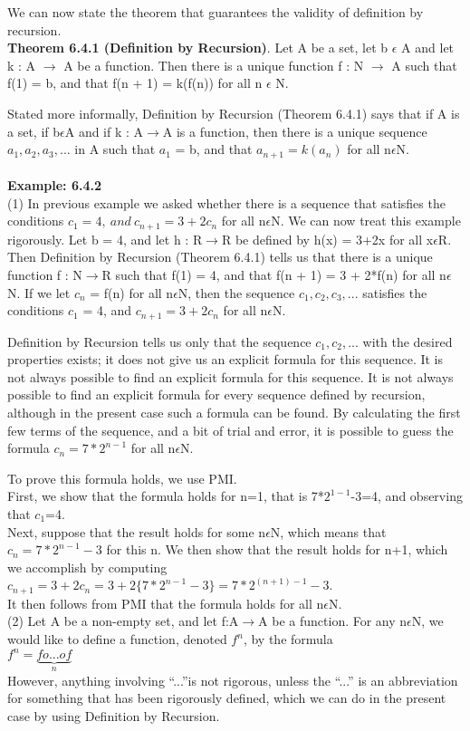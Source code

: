 \documentclass[a4paper,10pt]{report}
\begin{document}
    We can now state the theorem that guarantees the validity of definition by recursion. \\
{\bf Theorem 6.4.1 (Definition by Recursion)}. Let A be a set, let b $\epsilon$ A and let k : A $\rightarrow$ A be a function. Then there is a unique function f : N $\rightarrow$ A such that f(1) = b, and that f(n + 1) = k(f(n)) for all n $\epsilon$ N.

     Stated more informally, Definition by Recursion (Theorem 6.4.1) says that if A is a set, if b$\epsilon$A and if k : 
A$\rightarrow$A is a function,  then there is a unique sequence $a_1, a_2, a_3 , . . .$ in A such that $a_1$ = b, and that $a_{n+1} = k(a_n)$ for all n$\epsilon$N. \\\\
{\bf Example: 6.4.2} 
\\
(1) In previous example we asked whether there is a sequence that satisfies the conditions $c_1 = 4,~ and~ c_{n+1} = 3 + 2c_n$ for all n$\epsilon$N. We can now treat this example rigorously. Let b = 4, and let h : R$\rightarrow$R be defined by h(x) = 3+2x for all x$\epsilon$R. Then Definition by Recursion (Theorem 6.4.1) tells us that there is a unique function f : N$\rightarrow$R such that f(1) = 4, and that f(n + 1) = 3 + 2*f(n) for all n$\epsilon$N. If we let $c_n$ = f(n) for all n$\epsilon$N, then the sequence $c_1, c_2, c_3 , . . . $ satisfies the conditions $c_1$ = 4, and $c_{n+1}=3+2c_n$ for all n$\epsilon$N.


Definition by Recursion tells us only that the sequence $c_1, c_2, ...$ with the desired properties exists; it does not give us an explicit formula for this sequence. It is not always possible to find an explicit formula for this sequence. It is not always possible to find an explicit formula for every sequence defined by recursion, although in the present case such a formula can be found. By calculating the first few terms of the sequence, and a bit of trial and error, it is possible to guess the formula $c_n=7*2^{n-1}$ for all n$\epsilon$N.

To prove this formula holds, we use PMI. \\First, we show that the formula holds for n=1, that is 7*$2^{1-1}$-3=4, and observing that $c_1$=4. \\ Next, suppose that the result holds for some n$\epsilon$N, which means that $c_n=7*2^{n-1}-3$ for this n. We then show that the result holds for n+1, which we accomplish by computing\\ $c_{n+1}=3+2c_n=3+2\{7*2^{n-1}-3\}=7*2^{(n+1)-1}-3$.\\
It then follows from PMI that the formula holds for all n$\epsilon$N.\\
(2) Let A be a non-empty set, and let f:A$\rightarrow$A be a function. For any n$\epsilon$N, we would like to define a function, denoted $f^n$, by the formula\\
$f^n=\underbrace{fo...of}_n$\\
However, anything involving ``...''is not rigorous, unless the ``...'' is an abbreviation for something that has been rigorously defined, which we can do in the present case by using Definition by Recursion.
\end{document}
